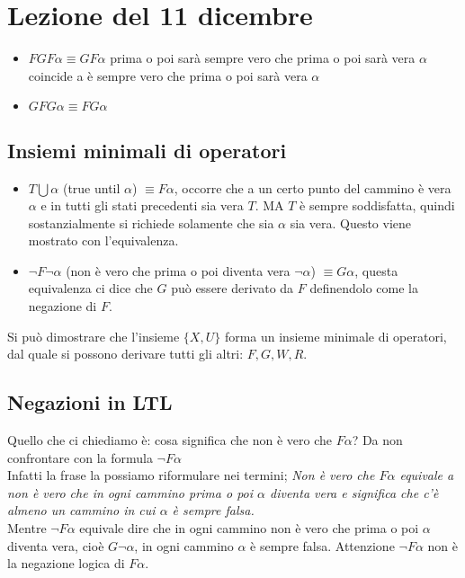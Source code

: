 \section{Lezione del 11 dicembre}
\begin{itemize}
    \item $FGF \alpha \equiv GF \alpha$	prima o poi sarà sempre vero che prima o poi sarà vera $\alpha$ coincide a è sempre vero che prima o poi sarà vera $\alpha$
    \item $GFG \alpha \equiv FG \alpha$	
\end{itemize}
\subsection{Insiemi minimali di operatori}
\begin{itemize}
    \item $T  \bigcup \alpha$ (true until $\alpha$) $\equiv F \alpha$, occorre che a un certo punto del cammino è vera $\alpha$ e in tutti gli stati precedenti sia vera $T$. MA $T$ è sempre soddisfatta, quindi sostanzialmente si richiede solamente che sia $\alpha$ sia vera. Questo viene mostrato con l'equivalenza. 
    \item $\neg F \neg \alpha$ (non è vero che prima o poi diventa vera $\neg \alpha$) $\equiv G \alpha$, questa equivalenza ci dice che $G$ può essere derivato da $F$ definendolo come la negazione di $F$.
\end{itemize}
Si può dimostrare che l’insieme $\{X, U\}$ forma un insieme minimale di operatori, dal quale si possono derivare tutti gli altri: $F, G, W, R$.

\subsection{Negazioni in LTL}
Quello che ci chiediamo è: cosa significa che non è vero che $F \alpha$? Da non confrontare con la formula  $\neg F \alpha$ \\
Infatti la frase la possiamo riformulare nei termini; \textit{Non è vero che $F \alpha$ equivale a non è vero che in ogni cammino prima o poi $\alpha$ diventa vera e significa che c’è almeno un cammino in cui $\alpha$ è sempre falsa.}\\
Mentre  $\neg F \alpha$  equivale dire che in ogni cammino non è vero che prima o poi $\alpha$ diventa vera, cioè $G \neg \alpha$, in ogni cammino $\alpha$ è sempre falsa. Attenzione $\neg F \alpha$ non è la negazione logica di $F \alpha$.

